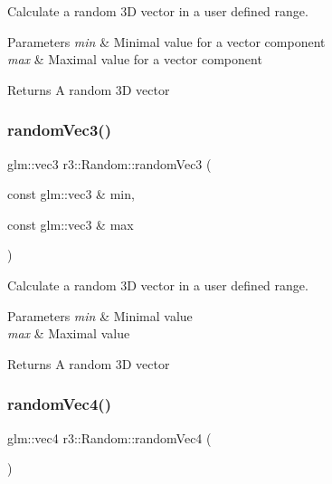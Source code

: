 Calculate a random 3D vector in a user defined range. 


\begin{DoxyParams}{Parameters}
{\em min} & Minimal value for a vector component \\
\hline
{\em max} & Maximal value for a vector component \\
\hline
\end{DoxyParams}
\begin{DoxyReturn}{Returns}
A random 3D vector 
\end{DoxyReturn}
\mbox{\label{classr3_1_1_random_a1011998debe4842957f855c11ed1e1c2}} 
\subsubsection{\texorpdfstring{random\+Vec3()}{randomVec3()}\hspace{0.1cm}{\footnotesize\ttfamily [3/3]}}
{\footnotesize\ttfamily glm\+::vec3 r3\+::\+Random\+::random\+Vec3 (\begin{DoxyParamCaption}\item[{const glm\+::vec3 \&}]{min,  }\item[{const glm\+::vec3 \&}]{max }\end{DoxyParamCaption})\hspace{0.3cm}{\ttfamily [static]}}



Calculate a random 3D vector in a user defined range. 


\begin{DoxyParams}{Parameters}
{\em min} & Minimal value \\
\hline
{\em max} & Maximal value \\
\hline
\end{DoxyParams}
\begin{DoxyReturn}{Returns}
A random 3D vector 
\end{DoxyReturn}
\mbox{\label{classr3_1_1_random_a567db457c9f995ca1062677d905f61d0}} 
\subsubsection{\texorpdfstring{random\+Vec4()}{randomVec4()}\hspace{0.1cm}{\footnotesize\ttfamily [1/3]}}
{\footnotesize\ttfamily glm\+::vec4 r3\+::\+Random\+::random\+Vec4 (\begin{DoxyParamCaption}{ }\end{DoxyParamCaption})\hspace{0.3cm}{\ttfamily [static]}}



